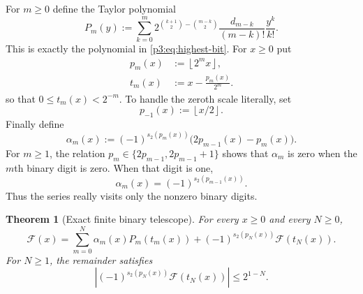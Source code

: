 \documentclass[11pt]{article}
\numberwithin{equation}{section}
\newtheorem{theorem}{Theorem}[section]
\theoremstyle{definition}
\theoremstyle{remark}
\newcommand{\GF}{\mathcal F}
\newcommand{\floor}[1]{\left\lfloor#1\right\rfloor}
\begin{document}
For $m\ge0$ define the Taylor polynomial
\begin{equation}\label{p3:eq:reduction-polynomial}
 P_m(y):=
 \sum_{k=0}^{m}
 2^{\binom{k+1}{2}-\binom{m-k}{2}}
 \frac{d_{m-k}}{(m-k)!}\frac{y^k}{k!}.
\end{equation}
This is exactly the polynomial in \eqref{p3:eq:highest-bit}.  For $x\ge0$ put
\begin{align}
 p_m(x)&:=\floor{2^m x},\label{p3:eq:binary-prefix}\\
 t_m(x)&:=x-\frac{p_m(x)}{2^m}.\label{p3:eq:binary-tail}
\end{align}
so that $0\le t_m(x)<2^{-m}$.  To handle the zeroth scale literally, set
\begin{equation}\label{p3:eq:previous-prefix}
 p_{-1}(x):=\floor{x/2}.
\end{equation}
Finally define
\begin{equation}\label{p3:eq:binary-series-coefficient}
 \alpha_m(x):=(-1)^{s_2(p_m(x))}
 \bigl(2p_{m-1}(x)-p_m(x)\bigr).
\end{equation}
For $m\ge1$, the relation
$p_m\in\{2p_{m-1},2p_{m-1}+1\}$ shows that $\alpha_m$ is zero when the
$m$th binary digit is zero.  When that digit is one,
\begin{equation}\label{p3:eq:alpha-one-bit}
 \alpha_m(x)=(-1)^{s_2(p_{m-1}(x))}.
\end{equation}
Thus the series really visits only the nonzero binary digits.

\begin{theorem}[Exact finite binary telescope]\label{p3:thm:binary-finite-telescope}
For every $x\ge0$ and every $N\ge0$,
\begin{equation}\label{p3:eq:binary-finite-telescope}
\boxed{
 \GF(x)=\sum_{m=0}^{N}\alpha_m(x)P_m(t_m(x))
 +(-1)^{s_2(p_N(x))}\GF(t_N(x)).}
\end{equation}
For $N\ge1$, the remainder satisfies
\begin{equation}\label{p3:eq:binary-remainder-bound}
 \left|(-1)^{s_2(p_N(x))}\GF(t_N(x))\right|
 \le 2^{1-N}.
\end{equation}
\end{theorem}
\end{document}
